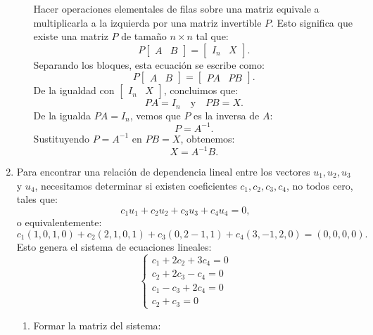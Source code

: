 \begin{enumerate}[label=\color{red}\textbf{\arabic*)}]
\begin{enumerate}[label=\arabic*)]
            Hacer operaciones elementales de filas sobre una matriz equivale a multiplicarla a la izquierda por una matriz invertible $P$. Esto significa que existe una matriz  $P$ de tamaño $n\times n$ tal que: \[
            P\begin{bmatrix} 
                A & B 
            \end{bmatrix} =\begin{bmatrix} 
                I_n & X 
            \end{bmatrix} .
            \] 
            Separando los bloques, esta ecuación se escribe como: \[
            P\begin{bmatrix} 
            A & B 
            \end{bmatrix} =\begin{bmatrix} 
            PA & PB 
            \end{bmatrix} .
            \] 
            De la igualdad con $\begin{bmatrix} 
                I_n & X 
            \end{bmatrix} $, concluimos que: \[
            PA=I_n\quad \text{y}\quad PB=X.
            \] 
            De la igualda $PA=I_n$, vemos que  $P$ es la inversa de  $A$:  \[
            P=A^{-1}.
            \] 
            Sustituyendo $P=A^{-1}$ en $PB=X$, obtenemos:  \[
            X=A^{-1}B.
            \] 
    \end{enumerate}
    \item {}

        Para encontrar una relación de dependencia lineal entre los vectores $u_1,u_2,u_3$ y $u_4$, necesitamos determinar si existen coeficientes $c_1,c_2,c_3,c_4$, no todos cero, tales que: \[
        c_1u_1+c_2u_2+c_3u_3+c_4u_4=0,
        \] o equivalentemente: \[
        c_1(1,0,1,0)+c_2(2,1,0,1)+c_3(0,2-1,1)+c_4(3,-1,2,0)=(0,0,0,0).
        \] 
        Esto genera el sistema de ecuaciones lineales: \[
        \begin{cases}
            c_1+2c_2+3c_4=0\\
            c_2+2c_3-c_4=0\\
            c_1-c_3+2c_4=0\\
            c_2+c_3=0
        \end{cases}
        \] 
        \begin{enumerate}[label=\arabic*)]
            \item Formar la matriz del sistema:


\end{enumerate}
\end{enumerate}
